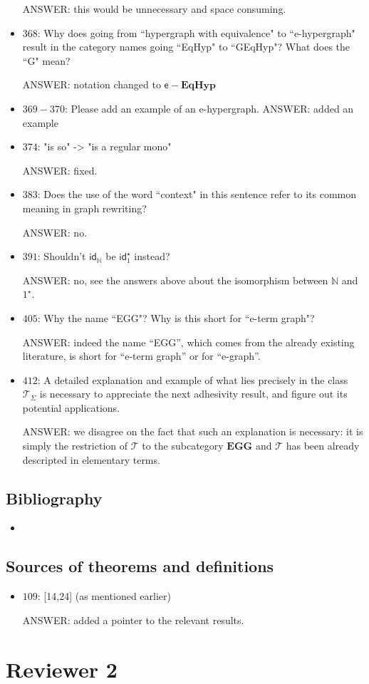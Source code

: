 \documentclass[english,11pt,a4paper]{article}
\begin{document}
\begin{itemize}
ANSWER: this would be unnecessary and space consuming.

\item $368$: Why does going from ``hypergraph with equivalence" to ``e-hypergraph" result in the category names going ``EqHyp" to ``GEqHyp"? What does the ``G" mean?

ANSWER: notation changed to $\mathsf{e}-\mathbf{EqHyp}$


\item $369-370$: Please add an example of an e-hypergraph.
ANSWER: added an example


\item $374$: "is so" -> "is a regular mono"

ANSWER: fixed.

\item $383$: Does the use of the word ``context" in this sentence refer to its common meaning in graph rewriting?

ANSWER: no.


\item $391$: Shouldn't $\mathsf{id}_\mathbb{N}$ be $\mathsf{id}^\star_1$ instead? 

ANSWER: no, see the answers above about the isomorphism between $\mathbb{N}$ and $1^\star$.

\item $405$: Why the name ``EGG"? Why is this short for ``e-term graph"?

ANSWER: indeed the name ``EGG'', which comes from the already existing literature, is short for ``e-term graph'' or for ``e-graph''.

\item $412$: A detailed explanation and example of what lies precisely in the class $\mathcal{T}_\Sigma$ is necessary to appreciate the next adhesivity result, and figure out its potential applications.

ANSWER: we disagree on the fact that such an explanation is necessary: it is simply the restriction of $\mathcal{T}$ to the subcategory $\mathbf{EGG}$ and $\mathcal{T}$ has been already descripted in elementary terms.
 \end{itemize}
\subsection*{Bibliography}
\begin{itemize}
	\item 
\end{itemize}

\subsection*{Sources of theorems and definitions}
\begin{itemize}
	\item $109$: [14,24] (as mentioned earlier)
	
	ANSWER: added a pointer to the relevant results.
\end{itemize}


\section*{Reviewer 2}



	
	
\end{document}
